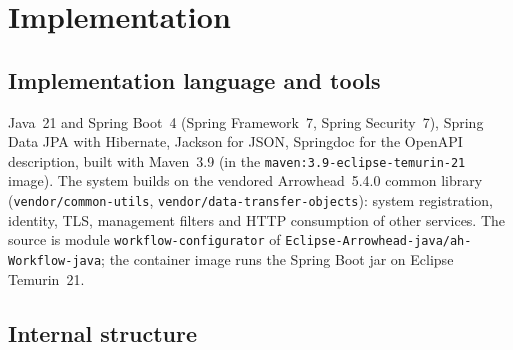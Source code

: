 \documentclass[a4paper]{arrowhead}
\begin{document}
\newpage
\section{Implementation}
\label{sec:implementation}

\subsection{Implementation language and tools}
Java~21 and Spring Boot~4 (Spring Framework~7, Spring Security~7), Spring Data JPA with Hibernate, Jackson for JSON,
Springdoc for the OpenAPI description, built with Maven~3.9 (in the \texttt{maven:3.9-eclipse-temurin-21} image). The
system builds on the vendored Arrowhead~5.4.0 common library (\texttt{vendor/common-utils},
\texttt{vendor/data-transfer-objects}): system registration, identity, TLS, management filters and HTTP consumption
of other services. The source is module \texttt{workflow-configurator} of \texttt{Eclipse-Arrowhead-java/ah-Workflow-java}; the
container image runs the Spring Boot jar on Eclipse Temurin~21.

\subsection{Internal structure}
\end{document}
